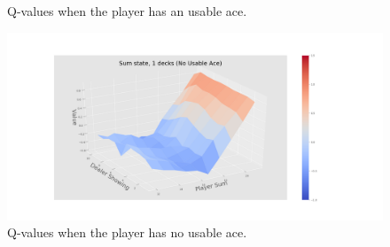 \begin{center}
\begin{figure}[htp]
   \caption{Q-values when the player has an usable ace. \label{sfig:3Dnd3}}
 \end{figure}
 \begin{figure}[htp]%
  	 \includegraphics[width=1.2\textwidth]{./figures/noace_3D_sum_1_decks.png}
   \caption{Q-values when the player has no usable ace. \label{sfig:3Dnd4}}
 \end{figure}
\end{center}